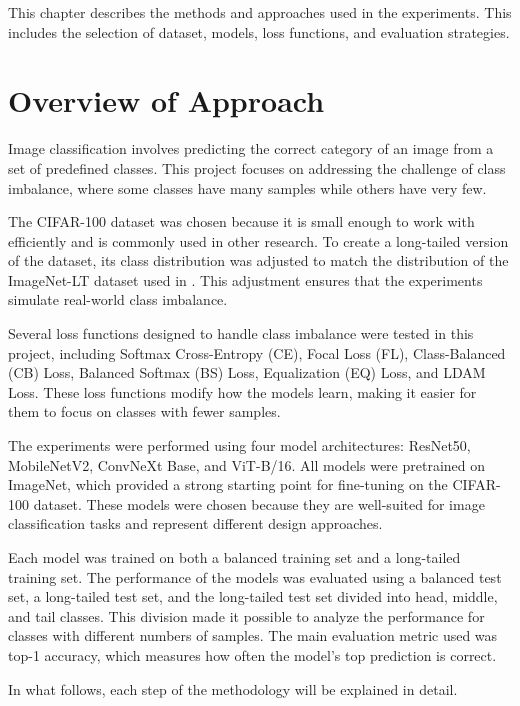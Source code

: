 
This chapter describes the methods and approaches used in the experiments. This includes the selection of dataset, models, loss functions, and evaluation strategies.

\section{Overview of Approach}

Image classification involves predicting the correct category of an image from a set of predefined classes. This project focuses on addressing the challenge of class imbalance, where some classes have many samples while others have very few.

The CIFAR-100 dataset \cite{krizhevsky2009learning} was chosen because it is small enough to work with efficiently and is commonly used in other research. To create a long-tailed version of the dataset, its class distribution was adjusted to match the distribution of the ImageNet-LT dataset used in \cite{zhang2023deep}. This adjustment ensures that the experiments simulate real-world class imbalance.

Several loss functions designed to handle class imbalance were tested in this project, including Softmax Cross-Entropy (CE), Focal Loss (FL), Class-Balanced (CB) Loss, Balanced Softmax (BS) Loss, Equalization (EQ) Loss, and LDAM Loss. These loss functions modify how the models learn, making it easier for them to focus on classes with fewer samples.

The experiments were performed using four model architectures: ResNet50, MobileNetV2, ConvNeXt Base, and ViT-B/16. All models were pretrained on ImageNet, which provided a strong starting point for fine-tuning on the CIFAR-100 dataset. These models were chosen because they are well-suited for image classification tasks and represent different design approaches.

Each model was trained on both a balanced training set and a long-tailed training set. The performance of the models was evaluated using a balanced test set, a long-tailed test set, and the long-tailed test set divided into head, middle, and tail classes. This division made it possible to analyze the performance for classes with different numbers of samples. The main evaluation metric used was top-1 accuracy, which measures how often the model's top prediction is correct.

In what follows, each step of the methodology will be explained in detail.

